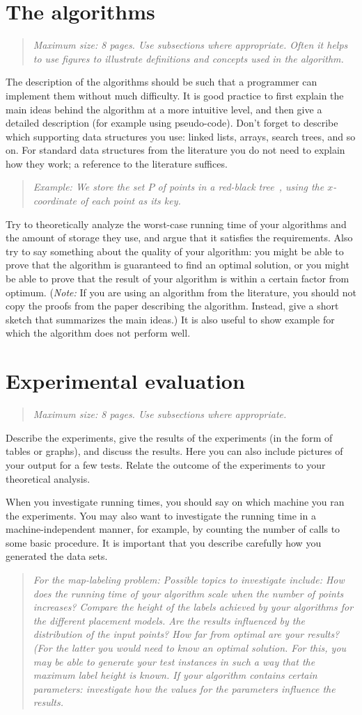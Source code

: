 \documentclass[11pt]{article}
\newcommand{\maxsize}[1]{\begin{quotation} {\sl \noindent Maximum size: #1.} \end{quotation}}
\newcommand{\ml}[1]{\begin{quotation} {\sl \noindent For the map-labeling problem: #1} \end{quotation}}
\newcommand{\example}[1]{\begin{quotation} {\sl \noindent Example: #1} \end{quotation}}
\begin{document}
\section{The algorithms}
\label{se:algorithms}
\maxsize{8 pages. Use subsections where appropriate. Often it helps to use figures
to illustrate definitions and concepts used in the algorithm}
%
The description of the algorithms should be such that a programmer can
implement them without much difficulty. It is good practice to first explain the
main ideas behind the algorithm at a more intuitive level, and then give a
detailed description (for example using pseudo-code).
Don't forget to describe which supporting data structures you use:
linked lists, arrays, search trees, and so on. For standard data structures
from the literature you do not need to explain how they work; a reference
to the literature suffices.
%
\example{We store the set $P$ of points in a red-black tree~\cite{clrs-ia-01},
         using the $x$-coordinate of each point as its key.}
%
Try to theoretically analyze the worst-case running time of your algorithms
and the amount of storage they use, and argue that it satisfies the requirements.
Also try to say something about the quality of your algorithm: you might be able to prove that the algorithm is guaranteed to find an optimal solution, or
you might be able to prove that the result of your algorithm is within a certain factor
from optimum. (\emph{Note:} If you are using an algorithm from the literature, you should not
copy the proofs from the paper describing the algorithm. Instead, give a short sketch that
summarizes the main ideas.)
It is also useful to show example for which the algorithm does not
perform well.


\section{Experimental evaluation}
\label{se:evaluation}
\maxsize{8 pages. Use subsections where appropriate}
Describe the experiments, give the results of the experiments (in the form of tables or graphs),
and discuss the results. Here you can also include pictures of your output for a few tests.
Relate the outcome of the experiments to your theoretical analysis.

When you investigate running times, you should say on which machine you ran the experiments.
You may also want to investigate the running time in a  machine-independent manner,
for example, by counting the number of calls to some basic procedure.
It is important that you describe carefully how you generated the data sets.
\ml{Possible topics to investigate include: How does the running time of your algorithm
scale when the number of points increases? Compare the height of the labels achieved by
your algorithms for the different placement models. Are the results influenced by the
distribution of the input points? How far from optimal are your results? (For the latter you
would need to know an optimal solution. For this, you may be able to generate your test instances in
such a way that the maximum label height is known. If your algorithm contains certain
parameters: investigate how the values for the parameters influence the results.}
\end{document}
